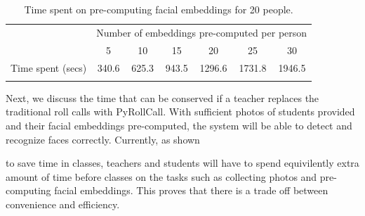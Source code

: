 \begin{table}[!htb]
\centering
\caption{Time spent on pre-computing facial embeddings for 20 people.} 
\begin{tabular}{@{}lcccccc@{}}
\toprule[2pt]
& \multicolumn{6}{c}{Number of embeddings pre-computed per person}                    \\ \addlinespace[0.5em]
                  & 5       & 10      & 15      & 20       & 25       & 30            \\ \midrule \addlinespace[0.5em]
Time spent (secs) & 340.6   & 625.3   & 943.5   & 1296.6   & 1731.8   & 1946.5        \\ \addlinespace[0.5em]
\bottomrule[2pt]
\end{tabular}
\label{tab:time-spent-on-training}
\end{table}

Next, we discuss the time that can be conserved if a teacher replaces the traditional roll calls
with PyRollCall.
With sufficient photos of students provided and their facial embeddings pre-computed,
the system will be able to detect and recognize faces correctly. Currently, as shown

to save time in classes, teachers and students will have to spend equivilently extra amount of time
before classes on the tasks such as collecting photos and pre-computing facial embeddings.
This proves that there is a trade off between convenience and efficiency.
\vspace{0.2cm}

